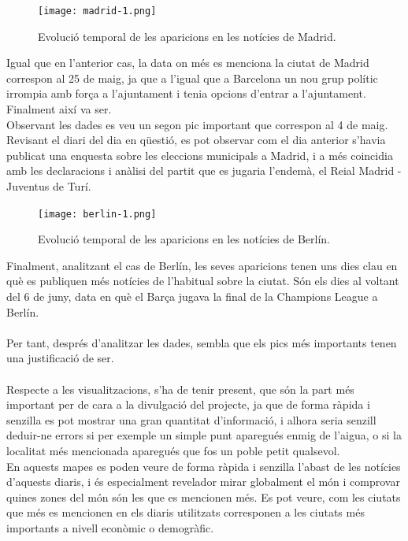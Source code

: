 \documentclass[12pt,a4paper,openright,oneside]{article}
\numberwithin{equation}{section}
\theoremstyle{definition}
\begin{document}
\begin{figure}[!htbp]
\centering
\texttt{[image: madrid-1.png]}
\caption{Evolució temporal de les aparicions en les notícies de Madrid.}
\end{figure}
Igual que en l'anterior cas, la data on més es menciona la ciutat de Madrid correspon al 25 de maig, ja que a l'igual que a Barcelona un nou grup polític irrompia amb força a l'ajuntament i tenia opcions d'entrar a l'ajuntament. Finalment així va ser.\\
Observant les dades es veu un segon pic important que correspon al 4 de maig. Revisant el diari del dia en qüestió, es pot observar com el dia anterior s'havia publicat una enquesta sobre les eleccions municipals a Madrid, i a més coincidia amb les declaracions i anàlisi del partit que es jugaria l'endemà, el Reial Madrid - Juventus de Turí.\\
\begin{figure}[!htbp]
\centering
\texttt{[image: berlin-1.png]}
\caption{Evolució temporal de les aparicions en les notícies de Berlín.}
\end{figure}

Finalment, analitzant el cas de Berlín, les seves aparicions tenen uns dies clau en què es publiquen més notícies de l'habitual sobre la ciutat. Són els dies al voltant del 6 de juny, data en què el Barça jugava la final de la Champions League a Berlín.\\\\
Per tant, després d'analitzar les dades, sembla que els pics més importants tenen una justificació de ser.\\\\
Respecte a les visualitzacions, s'ha de tenir present, que són la part més important per de cara a la divulgació del projecte, ja que de forma ràpida i senzilla es pot mostrar una gran quantitat d'informació, i alhora seria senzill deduir-ne errors si per exemple un simple punt aparegués enmig de l'aigua, o si la localitat més mencionada aparegués que fos un poble petit qualsevol.\\
En aquests mapes es poden veure de forma ràpida i senzilla l'abast de les notícies d'aquests diaris, i és especialment revelador mirar globalment el món i comprovar quines zones del món són les que es mencionen més. Es pot veure, com les ciutats que més es mencionen en els diaris utilitzats corresponen a les ciutats més importants a nivell econòmic o demogràfic. 
\end{document}
